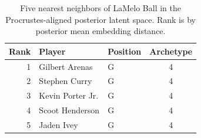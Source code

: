 \begin{table}[htbp]
  \centering\small
  \begin{tabular}{rllc}
    \toprule
    Rank & Player & Position & Archetype \\
    \midrule
    1 & Gilbert Arenas & G & 4 \\
    2 & Stephen Curry & G & 4 \\
    3 & Kevin Porter Jr. & G & 4 \\
    4 & Scoot Henderson & G & 4 \\
    5 & Jaden Ivey & G & 4 \\
    \bottomrule
  \end{tabular}
  \caption{Five nearest neighbors of LaMelo Ball in the Procrustes-aligned posterior latent space. Rank is by posterior mean embedding distance.}
  \label{tab:LaMelo_Ball_neighbors}
\end{table}

